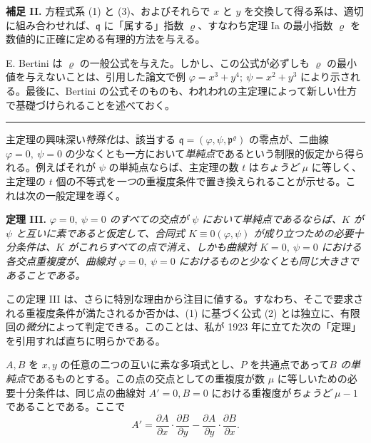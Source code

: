 \textbf{補足 II.} 方程式系 (1) と (3)、およびそれらで \(x\) と \(y\) を交換して得る系は、適切に組み合わせれば、\(\mathfrak{q}\) に「属する」指数 \(\varrho\)、すなわち定理 Ia の最小指数 \(\varrho\) を数値的に正確に定める有理的方法を与える。

E. Bertini は \(\varrho\) の一般公式を与えた。しかし、この公式が必ずしも \(\varrho\) の最小値を与えないことは、引用した論文で例 \(\varphi=x^3+y^4;\ \psi=x^2+y^3\) により示される。最後に、Bertini の公式そのものも、われわれの主定理によって新しい仕方で基礎づけられることを述べておく。

\begin{center}
\rule{4cm}{0.4pt}
\end{center}

主定理の興味深い\emph{特殊化}は、該当する \(\mathfrak{q}=(\varphi,\psi,\mathfrak{p}^\varrho)\) の零点が、二曲線 \(\varphi=0,\ \psi=0\) の少なくとも一方において\emph{単純点}であるという制限的仮定から得られる。例えばそれが \(\psi\) の単純点ならば、主定理の数 \(t\) は\emph{ちょうど} \(\mu\) に等しく、主定理の \(t\) 個の不等式を\emph{一つ}の重複度条件で置き換えられることが示せる。これは次の一般定理を導く。

\textbf{定理 III.} \emph{\(\varphi=0,\ \psi=0\) の\emph{すべての}交点が \(\psi\) において\emph{単純点}であるならば、\(K\) が \(\psi\) と互いに素であると仮定して、合同式 \(K\equiv0(\varphi,\psi)\) が成り立つための\emph{必要十分条件}は、\(K\) がこれらすべての点で消え、しかも曲線対 \(K=0,\ \psi=0\) における各交点重複度が、曲線対 \(\varphi=0,\ \psi=0\) におけるものと少なくとも同じ大きさであることである。}

この定理 III は、さらに特別な理由から注目に値する。すなわち、そこで要求される重複度条件が満たされるか否かは、(1) に基づく公式 (2) とは独立に、有限回の\emph{微分}によって判定できる。このことは、私が 1923 年に立てた次の「定理」を引用すれば直ちに明らかである。

\(A,B\) を \(x,y\) の任意の二つの互いに素な多項式とし、\(P\) を共通点であって\emph{\(B\) の単純点}であるものとする。この点の交点としての重複度が数 \(\mu\) に等しいための必要十分条件は、同じ点の曲線対 \(A'=0, B=0\) における重複度が\emph{ちょうど} \(\mu-1\) であることである。ここで
\[
A'=\frac{\partial A}{\partial x}\cdot\frac{\partial B}{\partial y}
-\frac{\partial A}{\partial y}\cdot\frac{\partial B}{\partial x}.
\]

